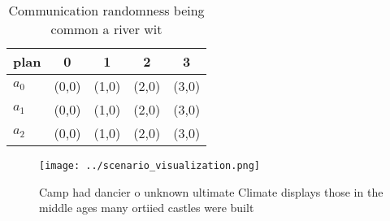 \documentclass[a4paper]{article}
\begin{document}
\begin{table}
\begin{adjustbox}{width=0.5\columnwidth}
\begin{tabular}{|l|l|l|l|l|}
\hline
\textbf{plan} & \multicolumn{1}{c|}{\textbf{0}} & \multicolumn{1}{c|}{\textbf{1}} & \multicolumn{1}{c|}{\textbf{2}} & \multicolumn{1}{c|}{\textbf{3}} \\ \hline
\textbf{$a_0$}  & (0,0) & (1,0) & (2,0) & (3,0) \\ \hline
\textbf{$a_1$}  & (0,0) & (1,0) & (2,0) & (3,0) \\ \hline
\textbf{$a_2$}  & (0,0) & (1,0) & (2,0) & (3,0) \\ \hline
\end{tabular}
\end{adjustbox}
\caption{Communication randomness being common a river wit
}
\end{table}

\begin{figure}
\centering
\texttt{[image: ../scenario\_visualization.png]}
\caption{Camp had dancier o unknown ultimate Climate displays those in the middle ages many ortiied castles were built
}
\end{figure}
 
\end{document}
